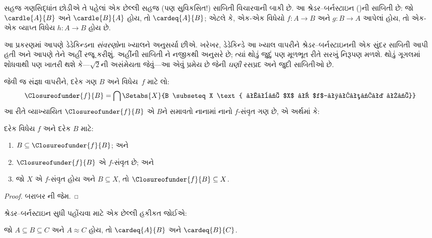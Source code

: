 \begingroup
\makeatletter{}\makeatother


\label{guunit:OLP-0054}


સહજ ગણસિદ્ધાંત છોડીએ તે પહેલાં એક છેલ્લી સહજ (પણ સુવિકસિત!) સાબિતી
વિચારવાની બાકી છે. આ શ્રેડર--બર્નસ્ટાઇન
()ની સાબિતી છે: જો
$\cardle{A}{B}$ અને $\cardle{B}{A}$ હોય, તો $\cardeq{A}{B}$; એટલે કે,
એક-એક વિધેયો $f \colon A \to B$ અને $g \colon B \to A$ આપેલાં હોય,
તો એક-એક વ્યાપ્ત વિધેય $h \colon A \to B$ હોય છે.

આ પ્રકરણમાં આપણે ડેડેકિન્ડના \emph{સંવરણો}ના ખ્યાલને અનુસર્યા છીએ.
ખરેખર, ડેડેકિન્ડે આ ખ્યાલ વાપરીને શ્રેડર--બર્નસ્ટાઇનની એક સુંદર
સાબિતી આપી હતી અને આપણે તેને અહીં રજૂ કરીશું. અહીંની સાબિતી
\citet[pp.~157--8]{Potter2004}ને નજીકથી અનુસરે છે; ત્યાં થોડું જુદું
પણ મૂળભૂત રીતે સરખું નિરૂપણ મળશે. થોડું ગૂગલમાં
શોધવાથી પણ ખાતરી થશે કે---$\sqrt{2}$ની અસંમેયતા જેવું---આ એવું પ્રમેય
છે જેની \emph{ઘણી} રસપ્રદ અને જુદી સાબિતીઓ છે.

 જેવી જ સંજ્ઞા વાપરીને,
દરેક ગણ $B$ અને વિધેય~$f$ માટે લો:
\[
\Closureofunder{f}{B} = \bigcap \Setabs{X}{B \subseteq X
\text{ અને $X$ એ $f$-સંવૃત છે}}
\]
આ રીતે વ્યાખ્યાયિત $\Closureofunder{f}{B}$ એ $B$ને સમાવતો નાનામાં
નાનો $f$-સંવૃત ગણ છે, એ અર્થમાં કે:

\begin{lem}
	દરેક વિધેય $f$ અને દરેક $B$ માટે:
	\begin{enumerate}
		\item{} $B \subseteq \Closureofunder{f}{B}$; અને
		\item{} $\Closureofunder{f}{B}$ એ $f$-સંવૃત છે; અને
		\item{} જો $X$ એ $f$-સંવૃત હોય અને $B
		\subseteq X$, તો $\Closureofunder{f}{B} \subseteq X$.
	\end{enumerate}
\end{lem}

\begin{proof}
બરાબર ની જેમ.
\end{proof}

શ્રેડર--બર્નસ્ટાઇન સુધી પહોંચવા માટે એક છેલ્લી હકીકત જોઈએ:

\begin{prop}
જો $A \subseteq B \subseteq C$ અને $A \approx C$ હોય, તો
$\cardeq{A}{B}$ અને $\cardeq{B}{C}$.
\end{prop}

